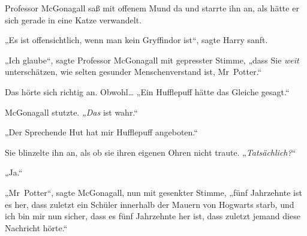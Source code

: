 

Professor McGonagall saß mit offenem Mund da und starrte ihn an, als hätte er sich gerade in eine Katze verwandelt.

„Es ist offensichtlich, wenn man kein Gryffindor ist“, sagte Harry sanft.

„Ich glaube“, sagte Professor McGonagall mit gepresster Stimme, „dass Sie \emph{weit} unterschätzen, wie selten gesunder Menschenverstand ist, Mr~Potter.“





Das hörte sich richtig an. Obwohl… „Ein Hufflepuff hätte das Gleiche gesagt.“

McGonagall stutzte. \emph{„Das} ist wahr.“

„Der Sprechende Hut hat mir Hufflepuff angeboten.“

Sie blinzelte ihn an, als ob sie ihren eigenen Ohren nicht traute. „\emph{Tatsächlich?}“

„Ja.“

„Mr~Potter“, sagte McGonagall, nun mit gesenkter Stimme, „fünf Jahrzehnte ist es her, dass zuletzt ein Schüler innerhalb der Mauern von Hogwarts starb, und ich bin mir nun sicher, dass es fünf Jahrzehnte her ist, dass zuletzt jemand diese Nachricht hörte.“

